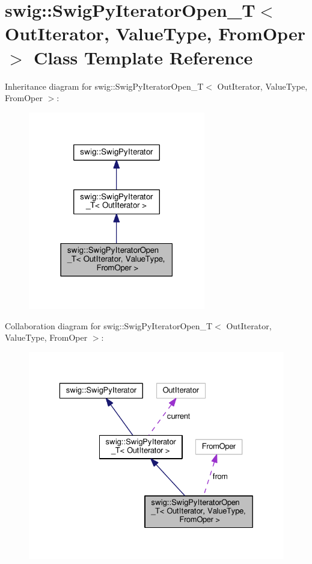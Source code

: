 \hypertarget{classswig_1_1SwigPyIteratorOpen__T}{}\section{swig\+:\+:Swig\+Py\+Iterator\+Open\+\_\+T$<$ Out\+Iterator, Value\+Type, From\+Oper $>$ Class Template Reference}
\label{classswig_1_1SwigPyIteratorOpen__T}


Inheritance diagram for swig\+:\+:Swig\+Py\+Iterator\+Open\+\_\+T$<$ Out\+Iterator, Value\+Type, From\+Oper $>$\+:\nopagebreak
\begin{figure}[H]
\begin{center}
\leavevmode
\includegraphics[width=219pt]{classswig_1_1SwigPyIteratorOpen__T__inherit__graph}
\end{center}
\end{figure}


Collaboration diagram for swig\+:\+:Swig\+Py\+Iterator\+Open\+\_\+T$<$ Out\+Iterator, Value\+Type, From\+Oper $>$\+:\nopagebreak
\begin{figure}[H]
\begin{center}
\leavevmode
\includegraphics[width=329pt]{classswig_1_1SwigPyIteratorOpen__T__coll__graph}
\end{center}
\end{figure}
